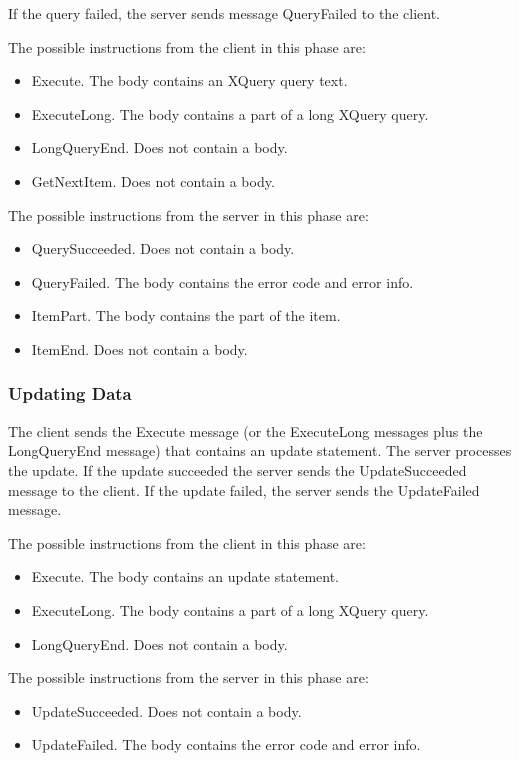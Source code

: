 \documentclass[a4paper,12pt]{article}
\begin{document}
If the query failed, the server sends message QueryFailed to the client.

The possible instructions from the client in this phase are:
\begin{itemize} 
\item Execute. The body contains an XQuery query text.
\item ExecuteLong. The body contains a part of a long XQuery query.
\item LongQueryEnd. Does not contain a body.
\item GetNextItem. Does not contain a body.
\end{itemize}

The possible instructions from the server in this phase are:
\begin{itemize} 
\item QuerySucceeded. Does not contain a body.
\item QueryFailed. The body contains the error code and error info.
\item ItemPart. The body contains the part of the item.
\item ItemEnd. Does not contain a body.
\end{itemize}

\subsubsection{Updating Data}

The client sends the Execute message (or the ExecuteLong messages plus the LongQueryEnd message) that contains an update statement. The server processes the update. If the update succeeded the server sends the UpdateSucceeded message to the client. If the update failed, the server sends the UpdateFailed message.

The possible instructions from the client in this phase are:
\begin{itemize}
\item Execute. The body contains an update statement.
\item ExecuteLong. The body contains a part of a long XQuery query.
\item LongQueryEnd. Does not contain a body.
\end{itemize}

The possible instructions from the server in this phase are:
\begin{itemize}
\item UpdateSucceeded. Does not contain a body.
\item UpdateFailed. The body contains the error code and error info.
\end{itemize}
\end{document}
